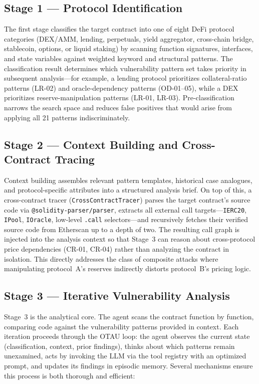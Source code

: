 \documentclass[10pt]{article}
\begin{document}
\subsection{Stage 1 --- Protocol Identification}
The first stage classifies the target contract into one of eight DeFi protocol categories (DEX/AMM, lending, perpetuals, yield aggregator, cross-chain bridge, stablecoin, options, or liquid staking) by scanning function signatures, interfaces, and state variables against weighted keyword and structural patterns. The classification result determines which vulnerability pattern set takes priority in subsequent analysis---for example, a lending protocol prioritizes collateral-ratio patterns (LR-02) and oracle-dependency patterns (OD-01--05), while a DEX prioritizes reserve-manipulation patterns (LR-01, LR-03). Pre-classification narrows the search space and reduces false positives that would arise from applying all 21 patterns indiscriminately.

\subsection{Stage 2 --- Context Building and Cross-Contract Tracing}
Context building assembles relevant pattern templates, historical case analogues, and protocol-specific attributes into a structured analysis brief. On top of this, a cross-contract tracer (\texttt{CrossContractTracer}) parses the target contract's source code via \texttt{@solidity-parser/parser}, extracts all external call targets---\texttt{IERC20}, \texttt{IPool}, \texttt{IOracle}, low-level \texttt{.call} selectors---and recursively fetches their verified source code from Etherscan up to a depth of two. The resulting call graph is injected into the analysis context so that Stage~3 can reason about cross-protocol price dependencies (CR-01, CR-04) rather than analyzing the contract in isolation. This directly addresses the class of composite attacks where manipulating protocol~A's reserves indirectly distorts protocol~B's pricing logic.

\subsection{Stage 3 --- Iterative Vulnerability Analysis}
Stage~3 is the analytical core. The agent scans the contract function by function, comparing code against the vulnerability patterns provided in context. Each iteration proceeds through the OTAU loop: the agent observes the current state (classification, context, prior findings), thinks about which patterns remain unexamined, acts by invoking the LLM via the tool registry with an optimized prompt, and updates its findings in episodic memory. Several mechanisms ensure this process is both thorough and efficient:
\end{document}
